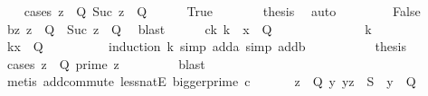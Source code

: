 \begin{isabellebody}
\ \ \isamarkupfalse%
\ {\isacharparenleft}{\kern0pt}cases\ {\isachardoublequoteopen}{\isasymexists}z\ {\isasymin}\ Q{\isachardot}{\kern0pt}\ Suc\ z\ {\isasymnotin}\ Q{\isachardoublequoteclose}{\isacharparenright}{\kern0pt}\isanewline
\ \ \ \ \isamarkupfalse%
\ True\isanewline
\ \ \ \ \isamarkupfalse%
\ \isamarkupfalse%
\ {\isacharquery}{\kern0pt}thesis\ \isamarkupfalse%
\ auto\isanewline
\ \ \isamarkupfalse%
\isanewline
\ \ \ \ \isamarkupfalse%
\ False\isanewline
\ \ \ \ \isamarkupfalse%
\ b{\isacharcolon}{\kern0pt}{\isachardoublequoteopen}{\isasymAnd}z{\isachardot}{\kern0pt}\ z\ {\isasymin}\ Q\ {\isasymLongrightarrow}\ Suc\ z\ {\isasymin}\ Q{\isachardoublequoteclose}\ \isamarkupfalse%
\ blast\isanewline
\ \ \ \ \isamarkupfalse%
\ c{\isacharcolon}{\kern0pt}{\isachardoublequoteopen}{\isasymAnd}k{\isachardot}{\kern0pt}\ k\ {\isacharplus}{\kern0pt}\ x\ {\isasymin}\ Q{\isachardoublequoteclose}\isanewline
\ \ \ \ \isamarkupfalse%
\ {\isacharminus}{\kern0pt}\isanewline
\ \ \ \ \ \ \isamarkupfalse%
\ k\isanewline
\ \ \ \ \ \ \isamarkupfalse%
\ {\isachardoublequoteopen}k{\isacharplus}{\kern0pt}x\ {\isasymin}\ Q{\isachardoublequoteclose}\isanewline
\ \ \ \ \ \ \ \ \isamarkupfalse%
\ {\isacharparenleft}{\kern0pt}induction\ {\isachardoublequoteopen}k{\isachardoublequoteclose}{\isacharcomma}{\kern0pt}\ simp\ add{\isacharcolon}{\kern0pt}a{\isacharcomma}{\kern0pt}\ simp\ add{\isacharcolon}{\kern0pt}b{\isacharparenright}{\kern0pt}\isanewline
\ \ \ \ \isamarkupfalse%
\isanewline
\ \ \ \ \isamarkupfalse%
\ {\isacharquery}{\kern0pt}thesis\ \isanewline
\ \ \ \ \ \ \isamarkupfalse%
\ {\isacharparenleft}{\kern0pt}cases\ {\isachardoublequoteopen}{\isasymexists}z\ {\isasymin}\ Q{\isachardot}{\kern0pt}\ prime\ z{\isachardoublequoteclose}{\isacharparenright}{\kern0pt}\isanewline
\ \ \ \ \ \ \ \isamarkupfalse%
\ blast\isanewline
\ \ \ \ \ \ \ \ \isamarkupfalse%
\ {\isacharparenleft}{\kern0pt}metis\ add{\isachardot}{\kern0pt}commute\ less{\isacharunderscore}{\kern0pt}natE\ bigger{\isacharunderscore}{\kern0pt}prime\ c{\isacharparenright}{\kern0pt}\isanewline
\ \ \isamarkupfalse%
\isanewline
\ \ \isamarkupfalse%
\ {\isachardoublequoteopen}{\isasymexists}z\ {\isasymin}\ Q{\isachardot}{\kern0pt}\ {\isasymforall}y{\isachardot}{\kern0pt}\ {\isacharparenleft}{\kern0pt}y{\isacharcomma}{\kern0pt}z{\isacharparenright}{\kern0pt}\ {\isasymin}\ {\isacharquery}{\kern0pt}S\ {\isasymlongrightarrow}\ y\ {\isasymnotin}\ Q{\isachardoublequoteclose}\ \isamarkupfalse%

\end{isabellebody}
